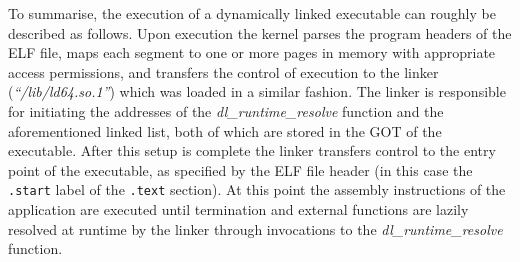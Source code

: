 To summarise, the execution of a dynamically linked executable can roughly be described as follows. Upon execution the kernel parses the program headers of the ELF file, maps each segment to one or more pages in memory with appropriate access permissions, and transfers the control of execution to the linker (\textit{``/lib/ld64.so.1''}) which was loaded in a similar fashion. The linker is responsible for initiating the addresses of the \textit{dl\_runtime\_resolve} function and the aforementioned linked list, both of which are stored in the GOT of the executable. After this setup is complete the linker transfers control to the entry point of the executable, as specified by the ELF file header (in this case the \texttt{.start} label of the \texttt{.text} section). At this point the assembly instructions of the application are executed until termination and external functions are lazily resolved at runtime by the linker through invocations to the \textit{dl\_runtime\_resolve} function.
